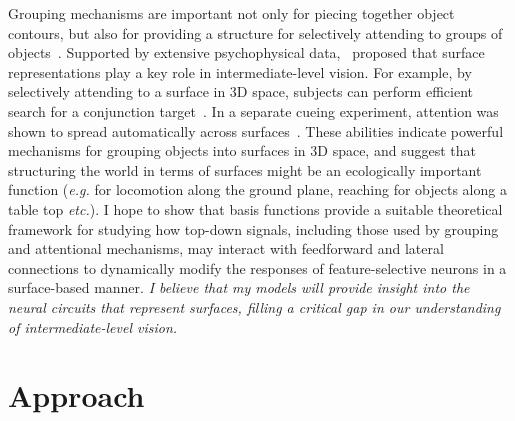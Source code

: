 \documentclass[11pt]{article}
\newcommand{\eg}[0]{{\em e.g.}\xspace}
\newcommand{\etc}[0]{{\em etc.}\xspace}
\begin{document}
Grouping mechanisms are important not only for piecing together object
contours, but also for providing a structure for selectively attending
to groups of objects~\citep{Treisman_Gelade80}. Supported by extensive
psychophysical data,~\citet*{Nakayama_etal95} proposed that surface
representations play a key role in intermediate-level vision. For
example, by selectively attending to a surface in 3D space, subjects
can perform efficient search for a conjunction
target~\citep{Nakayama_Silverman86}. In a separate cueing experiment,
attention was shown to spread automatically across
surfaces~\citep{He_Nakayama95}. These abilities indicate powerful
mechanisms for grouping objects into surfaces in 3D space, and suggest
that structuring the world in terms of surfaces might be an
ecologically important function (\eg for locomotion along the ground
plane, reaching for objects along a table top \etc).
I hope to show that basis functions provide a
    suitable theoretical framework for studying how
top-down signals, including those used by grouping and attentional
mechanisms, may interact with feedforward and lateral connections to
dynamically modify the responses of feature-selective
neurons 
in a surface-based manner.
\textit{I believe that my models will provide insight into the neural circuits that represent surfaces, filling a critical gap in our understanding of intermediate-level vision.}

\section{Approach}
\end{document}
